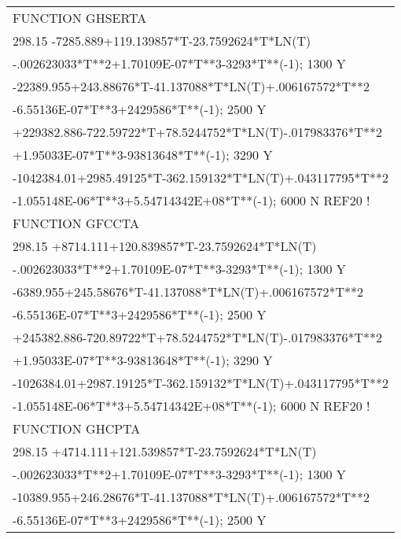 \begin{longtable}[H]{ l l l }
	\label{ab-table:snta1} \\
	\endhead
	\hline
	\endfoot
	FUNCTION GHSERTA & & \\
	\multicolumn{3}{l}{298.15 -7285.889+119.139857*T-23.7592624*T*LN(T)} \\ \multicolumn{3}{l}{-.002623033*T**2+1.70109E-07*T**3-3293*T**(-1); 1300 Y}\\
	\multicolumn{3}{l}{-22389.955+243.88676*T-41.137088*T*LN(T)+.006167572*T**2}\\
	\multicolumn{3}{l}{-6.55136E-07*T**3+2429586*T**(-1); 2500 Y}\\
	\multicolumn{3}{l}{+229382.886-722.59722*T+78.5244752*T*LN(T)-.017983376*T**2}\\
	\multicolumn{3}{l}{+1.95033E-07*T**3-93813648*T**(-1); 3290 Y}\\
	\multicolumn{3}{l}{-1042384.01+2985.49125*T-362.159132*T*LN(T)+.043117795*T**2}\\
	\multicolumn{3}{l}{-1.055148E-06*T**3+5.54714342E+08*T**(-1); 6000 N REF20 !}\\
	FUNCTION GFCCTA & & \\
	\multicolumn{3}{l}{298.15 +8714.111+120.839857*T-23.7592624*T*LN(T)}\\
	\multicolumn{3}{l}{-.002623033*T**2+1.70109E-07*T**3-3293*T**(-1); 1300 Y}\\
	\multicolumn{3}{l}{-6389.955+245.58676*T-41.137088*T*LN(T)+.006167572*T**2}\\
	\multicolumn{3}{l}{-6.55136E-07*T**3+2429586*T**(-1); 2500 Y}\\
	\multicolumn{3}{l}{+245382.886-720.89722*T+78.5244752*T*LN(T)-.017983376*T**2}\\
	\multicolumn{3}{l}{+1.95033E-07*T**3-93813648*T**(-1); 3290 Y}\\
	\multicolumn{3}{l}{-1026384.01+2987.19125*T-362.159132*T*LN(T)+.043117795*T**2}\\
	\multicolumn{3}{l}{-1.055148E-06*T**3+5.54714342E+08*T**(-1); 6000 N REF20 !}\\
	FUNCTION GHCPTA & & \\
	\multicolumn{3}{l}{298.15 +4714.111+121.539857*T-23.7592624*T*LN(T)}\\
	\multicolumn{3}{l}{-.002623033*T**2+1.70109E-07*T**3-3293*T**(-1); 1300 Y}\\
	\multicolumn{3}{l}{-10389.955+246.28676*T-41.137088*T*LN(T)+.006167572*T**2}\\
	\multicolumn{3}{l}{-6.55136E-07*T**3+2429586*T**(-1); 2500 Y}\\

\end{longtable}
